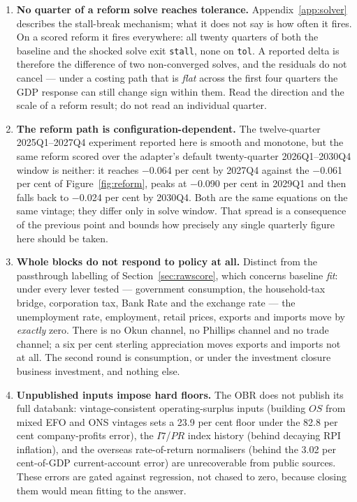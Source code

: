 \begin{enumerate}
\item \textbf{No quarter of a reform solve reaches tolerance.} Appendix~\ref{app:solver} describes the stall-break mechanism; what it does not say is how often it fires. On a scored reform it fires everywhere: all twenty quarters of both the baseline and the shocked solve exit \texttt{stall}, none on \texttt{tol}. A reported delta is therefore the difference of two non-converged solves, and the residuals do not cancel --- under a costing path that is \emph{flat} across the first four quarters the GDP response can still change sign within them. Read the direction and the scale of a reform result; do not read an individual quarter.

\item \textbf{The reform path is configuration-dependent.} The twelve-quarter 2025Q1--2027Q4 experiment reported here is smooth and monotone, but the same reform scored over the adapter's default twenty-quarter 2026Q1--2030Q4 window is neither: it reaches $-$0.064 per cent by 2027Q4 against the $-$0.061 per cent of Figure~\ref{fig:reform}, peaks at $-$0.090 per cent in 2029Q1 and then falls back to $-$0.024 per cent by 2030Q4. Both are the same equations on the same vintage; they differ only in solve window. That spread is a consequence of the previous point and bounds how precisely any single quarterly figure here should be taken.

\item \textbf{Whole blocks do not respond to policy at all.} Distinct from the passthrough labelling of Section~\ref{sec:rawscore}, which concerns baseline \emph{fit}: under every lever tested --- government consumption, the household-tax bridge, corporation tax, Bank Rate and the exchange rate --- the unemployment rate, employment, retail prices, exports and imports move by \emph{exactly} zero. There is no Okun channel, no Phillips channel and no trade channel; a six per cent sterling appreciation moves exports and imports not at all. The second round is consumption, or under the investment closure business investment, and nothing else.

\item \textbf{Unpublished inputs impose hard floors.} The OBR does not publish its full databank: vintage-consistent operating-surplus inputs (building $OS$ from mixed EFO and ONS vintages sets a 23.9 per cent floor under the 82.8 per cent company-profits error), the $I7$/$PR$ index history (behind decaying RPI inflation), and the overseas rate-of-return normalisers (behind the 3.02 per cent-of-GDP current-account error) are unrecoverable from public sources. These errors are gated against regression, not chased to zero, because closing them would mean fitting to the answer.


\end{enumerate}
